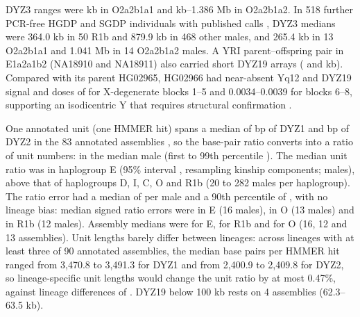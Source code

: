 DYZ3 ranges were  kb in O2a2b1a1 and  kb--1.386 Mb in O2a2b1a2. In 518 further PCR-free HGDP and SGDP individuals with published calls \cite{Hallast2021}, DYZ3 medians were 364.0 kb in 50 R1b and 879.9 kb in 468 other males, and 265.4 kb in 13 O2a2b1a1 and 1.041 Mb in 14 O2a2b1a2 males. A YRI parent--offspring pair in E1a2a1b2 (NA18910 and NA18911) also carried short DYZ19 arrays ( and  kb).  Compared with its parent HG02965, HG02966 had near-absent Yq12 and DYZ19 signal and doses of  for X-degenerate blocks 1--5 and 0.0034--0.0039 for blocks 6--8, supporting an isodicentric Y that requires structural confirmation \cite{Porubsky2025}.

One annotated unit (one HMMER hit) spans a median of  bp of DYZ1 and  bp of DYZ2 in the 83 annotated assemblies \cite{Hallast2026}, so the base-pair ratio converts into a ratio of unit numbers:  in the median male (first to 99th percentile ).  The median unit ratio was  in haplogroup E (95\% interval , resampling kinship components;  males),  above that of haplogroups D, I, C, O and R1b (20 to 282 males per haplogroup). The ratio error had a median of  per male and a 90th percentile of , with no lineage bias: median signed ratio errors were  in E (16 males),  in O (13 males) and  in R1b (12 males). Assembly medians were  for E,  for R1b and  for O (16, 12 and 13 assemblies). Unit lengths barely differ between lineages: across lineages with at least three of 90 annotated assemblies, the median base pairs per HMMER hit ranged from 3,470.8 to 3,491.3 for DYZ1 and from 2,400.9 to 2,409.8 for DYZ2, so lineage-specific unit lengths would change the unit ratio by at most 0.47\%, against lineage differences of . DYZ19 below 100 kb rests on 4 assemblies (62.3--63.5 kb).

